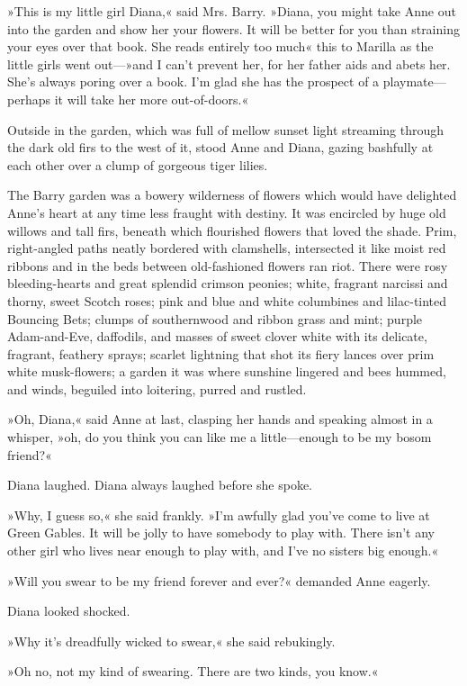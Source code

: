 »This is my little girl Diana,« said Mrs. Barry. »Diana, you might take Anne out into the garden and show her your flowers. It will be better for you than straining your eyes over that book. She reads entirely too much\longdash« this to Marilla as the little girls went out—»and I can't prevent her, for her father aids and abets her. She's always poring over a book. I'm glad she has the prospect of a playmate—perhaps it will take her more out-of-doors.«

Outside in the garden, which was full of mellow sunset light streaming through the dark old firs to the west of it, stood Anne and Diana, gazing bashfully at each other over a clump of gorgeous tiger lilies.

The Barry garden was a bowery wilderness of flowers which would have delighted Anne's heart at any time less fraught with destiny. It was encircled by huge old willows and tall firs, beneath which flourished flowers that loved the shade. Prim, right-angled paths neatly bordered with clamshells, intersected it like moist red ribbons and in the beds between old-fashioned flowers ran riot. There were rosy bleeding-hearts and great splendid crimson peonies; white, fragrant narcissi and thorny, sweet Scotch roses; pink and blue and white columbines and lilac-tinted Bouncing Bets; clumps of southernwood and ribbon grass and mint; purple Adam-and-Eve, daffodils, and masses of sweet clover white with its delicate, fragrant, feathery sprays; scarlet lightning that shot its fiery lances over prim white musk-flowers; a garden it was where sunshine lingered and bees hummed, and winds, beguiled into loitering, purred and rustled.

»Oh, Diana,« said Anne at last, clasping her hands and speaking almost in a whisper, »oh, do you think you can like me a little—enough to be my bosom friend?«

Diana laughed. Diana always laughed before she spoke.

»Why, I guess so,« she said frankly. »I'm awfully glad you've come to live at Green Gables. It will be jolly to have somebody to play with. There isn't any other girl who lives near enough to play with, and I've no sisters big enough.«

»Will you swear to be my friend forever and ever?« demanded Anne eagerly.

Diana looked shocked.

»Why it's dreadfully wicked to swear,« she said rebukingly.

»Oh no, not my kind of swearing. There are two kinds, you know.«

